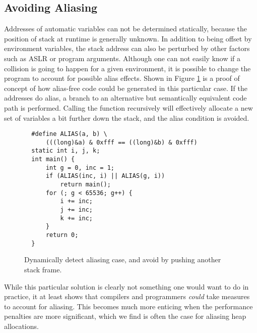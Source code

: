 \documentclass[prodmode,acmtaco]{acmsmall}
\begin{document}
{\subsection{Avoiding Aliasing}
Addresses of automatic variables can not be determined statically, because the position of stack at runtime is generally unknown. 
In addition to being offset by environment variables, the stack address can also be perturbed by other factors such as ASLR or program arguments. 
Although one can not easily know if a collision is going to happen for a given environment, it is possible to change the program to account for possible alias effects.
Shown in Figure \ref{lst:loopfixed} is a proof of concept of how alias-free code could be generated in this particular case.
If the addresses do alias, a branch to an alternative but semantically equivalent code path is performed.
Calling the function recursively will effectively allocate a new set of variables a bit further down the stack, and the alias condition is avoided.

\begin{figure}
  \begin{lstlisting}
  #define ALIAS(a, b) \
      (((long)&a) & 0xfff == ((long)&b) & 0xfff)
  static int i, j, k;
  int main() {
      int g = 0, inc = 1;
      if (ALIAS(inc, i) || ALIAS(g, i))
          return main();
      for (; g < 65536; g++) {
          i += inc;
          j += inc;
          k += inc;
      }
      return 0;
  }
  \end{lstlisting}
  \caption{Dynamically detect aliasing case, and avoid by pushing another stack frame.}
  \label{lst:loopfixed}
\end{figure}

While this particular solution is clearly not something one would want to do in practice, it at least shows that compilers and programmers \emph{could} take measures to account for aliasing.
This becomes much more enticing when the performance penalties are more significant, which we find is often the case for aliasing heap allocations.


}
\end{document}
